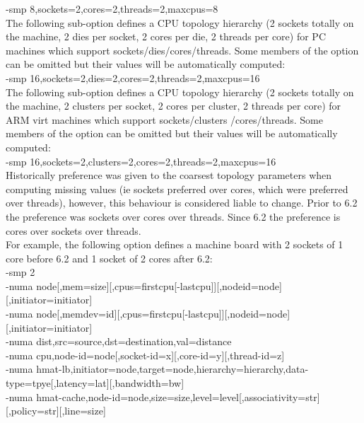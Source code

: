 \documentclass[11pt, a4paper, oneside]{article}
\theoremstyle{definition}
\begin{document}
    -smp 8,sockets=2,cores=2,threads=2,maxcpus=8\\

    The following sub-option defines a CPU topology hierarchy (2 sockets totally on the machine, 2 dies per socket, 2 cores per die, 2 threads per core) for PC machines which support sockets/dies/cores/threads. Some members of the option can be omitted but their values will be automatically computed:\\

    -smp 16,sockets=2,dies=2,cores=2,threads=2,maxcpus=16\\

    The following sub-option defines a CPU topology hierarchy (2 sockets totally on the machine, 2 clusters per socket, 2 cores per cluster, 2 threads per core) for ARM virt machines which support sockets/clusters /cores/threads. Some members of the option can be omitted but their values will be automatically computed:\\

    -smp 16,sockets=2,clusters=2,cores=2,threads=2,maxcpus=16\\

    Historically preference was given to the coarsest topology parameters when computing missing values (ie sockets preferred over cores, which were preferred over threads), however, this behaviour is considered liable to change. Prior to 6.2 the preference was sockets over cores over threads. Since 6.2 the preference is cores over sockets over threads.\\

    For example, the following option defines a machine board with 2 sockets of 1 core before 6.2 and 1 socket of 2 cores after 6.2:\\

    -smp 2\\

-numa node[,mem=size][,cpus=firstcpu[-lastcpu]][,nodeid=node][,initiator=initiator]\\
-numa node[,memdev=id][,cpus=firstcpu[-lastcpu]][,nodeid=node][,initiator=initiator]\\
-numa dist,src=source,dst=destination,val=distance\\
-numa cpu,node-id=node[,socket-id=x][,core-id=y][,thread-id=z]\\
-numa hmat-lb,initiator=node,target=node,hierarchy=hierarchy,data-type=tpye[,latency=lat][,bandwidth=bw]\\
-numa hmat-cache,node-id=node,size=size,level=level[,associativity=str][,policy=str][,line=size]\\
\end{document}
